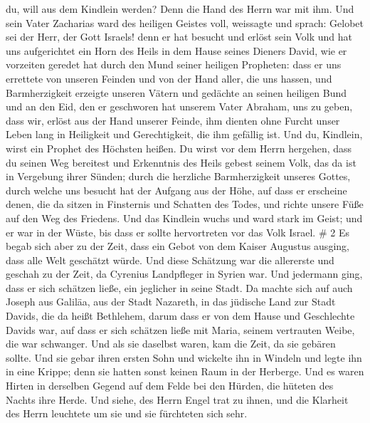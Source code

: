 du, will aus dem Kindlein werden? Denn die Hand des Herrn war mit ihm.
 Und sein Vater Zacharias ward des heiligen Geistes voll,
weissagte und sprach:  Gelobet sei der Herr, der Gott
Israels! denn er hat besucht und erlöst sein Volk  und hat
uns aufgerichtet ein Horn des Heils in dem Hause seines Dieners David,
 wie er vorzeiten geredet hat durch den Mund seiner
heiligen Propheten:  dass er uns errettete von unseren
Feinden und von der Hand aller, die uns hassen,  und
Barmherzigkeit erzeigte unseren Vätern und gedächte an seinen heiligen
Bund  und an den Eid, den er geschworen hat unserem Vater
Abraham, uns zu geben,  dass wir, erlöst aus der Hand
unserer Feinde, ihm dienten ohne Furcht unser Leben lang 
in Heiligkeit und Gerechtigkeit, die ihm gefällig ist.  Und
du, Kindlein, wirst ein Prophet des Höchsten heißen. Du wirst vor dem
Herrn hergehen, dass du seinen Weg bereitest  und
Erkenntnis des Heils gebest seinem Volk, das da ist in Vergebung ihrer
Sünden;  durch die herzliche Barmherzigkeit unseres Gottes,
durch welche uns besucht hat der Aufgang aus der Höhe,  auf
dass er erscheine denen, die da sitzen in Finsternis und Schatten des
Todes, und richte unsere Füße auf den Weg des Friedens. 
Und das Kindlein wuchs und ward stark im Geist; und er war in der Wüste,
bis dass er sollte hervortreten vor das Volk Israel. \# 2 
Es begab sich aber zu der Zeit, dass ein Gebot von dem Kaiser Augustus
ausging, dass alle Welt geschätzt würde.  Und diese
Schätzung war die allererste und geschah zu der Zeit, da Cyrenius
Landpfleger in Syrien war.  Und jedermann ging, dass er sich
schätzen ließe, ein jeglicher in seine Stadt.  Da machte
sich auf auch Joseph aus Galiläa, aus der Stadt Nazareth, in das
jüdische Land zur Stadt Davids, die da heißt Bethlehem, darum dass er
von dem Hause und Geschlechte Davids war,  auf dass er sich
schätzen ließe mit Maria, seinem vertrauten Weibe, die war schwanger.
 Und als sie daselbst waren, kam die Zeit, da sie gebären
sollte.  Und sie gebar ihren ersten Sohn und wickelte ihn in
Windeln und legte ihn in eine Krippe; denn sie hatten sonst keinen Raum
in der Herberge.  Und es waren Hirten in derselben Gegend
auf dem Felde bei den Hürden, die hüteten des Nachts ihre Herde.
 Und siehe, des Herrn Engel trat zu ihnen, und die Klarheit
des Herrn leuchtete um sie und sie fürchteten sich sehr. 
